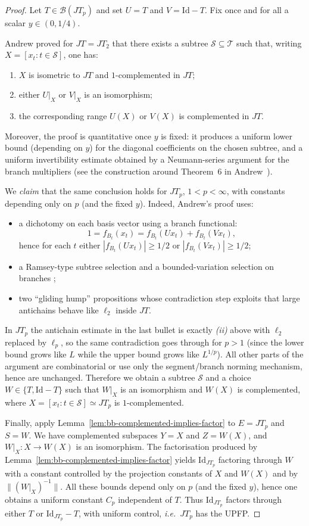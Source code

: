\documentclass[11pt]{amsart}
\theoremstyle{plain}
\theoremstyle{definition}
\numberwithin{equation}{section}
\newcommand{\Id}{\mathrm{Id}}
\renewcommand{\ge}{\geqslant}
\begin{document}
\begin{proof}
Let $T\in\mathscr B(JT_p)$ and set $U=T$ and $V=\Id-T$.
Fix once and for all a scalar $y\in(0,1/4)$.

Andrew proved for $JT=JT_2$ that there exists a subtree $\mathcal S\subseteq\mathcal T$ such that, writing
$X=[x_t:t\in\mathcal S]$, one has:
\begin{enumerate}
\item[(a)] $X$ is isometric to $JT$ and $1$-complemented in $JT$;
\item[(b)] either $U|_X$ or $V|_X$ is an isomorphism;
\item[(c)] the corresponding range $U(X)$ or $V(X)$ is complemented in $JT$.
\end{enumerate}
Moreover, the proof is quantitative once $y$ is fixed: it produces a uniform lower bound (depending on $y$)
for the diagonal coefficients on the chosen subtree, and a uniform invertibility estimate obtained by a Neumann-series
argument for the branch multipliers (see the construction around Theorem~6 in Andrew~\cite{Andrew1983}).

We \emph{claim} that the same conclusion holds for $JT_p$, $1<p<\infty$, with constants depending only on $p$ (and the fixed $y$).
Indeed, Andrew's proof uses:
\begin{itemize}
\item a dichotomy on each basis vector using a branch functional:
\[
1=f_{B_t}(x_t)=f_{B_t}(Ux_t)+f_{B_t}(Vx_t),
\]
hence for each $t$ either $|f_{B_t}(Ux_t)|\ge 1/2$ or $|f_{B_t}(Vx_t)|\ge 1/2$;
\item a Ramsey-type subtree selection \cite[Proposition~4]{Andrew1983} and a bounded-variation selection on branches \cite[Proposition~5]{Andrew1983};
\item two ``gliding hump'' propositions \cite[Propositions~2-3]{Andrew1983} whose contradiction step exploits that large antichains behave like
$\ell_2$ inside $JT$.
\end{itemize}
In $JT_p$ the antichain estimate in the last bullet is exactly \emph{(ii)} above with $\ell_2$ replaced by $\ell_p$,
so the same contradiction goes through for $p>1$ (since the lower bound grows like $L$ while the upper bound grows like $L^{1/p}$).
All other parts of the argument are combinatorial or use only the segment/branch norming mechanism, hence are unchanged.
Therefore we obtain a subtree $\mathcal S$ and a choice $W\in\{T,\Id-T\}$ such that
$W|_X$ is an isomorphism and $W(X)$ is complemented, where $X=[x_t:t\in\mathcal S]\simeq JT_p$ is $1$-complemented.

Finally, apply Lemma~\ref{lem:bb-complemented-implies-factor} to $E=JT_p$ and $S=W$. We have complemented subspaces $Y=X$ and $Z=W(X)$, and $W|_X\colon X\to W(X)$ is an isomorphism.
The factorisation produced by Lemma~\ref{lem:bb-complemented-implies-factor} yields
$\Id_{JT_p}$ factoring through $W$ with a constant controlled by the projection constants of $X$ and $W(X)$ and by
$\|(W|_X)^{-1}\|$. All these bounds depend only on $p$ (and the fixed $y$), hence one obtains a uniform constant $C_p$
independent of $T$. Thus $\Id_{JT_p}$ factors through either $T$ or $\Id_{JT_p}-T$, with uniform control, \emph{i.e.}\ $JT_p$ has the UPFP.
\end{proof}
\end{document}
